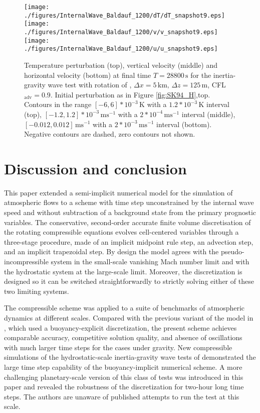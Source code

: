 \documentclass{ametsoc}
\theoremstyle{definition}
\begin{document}
\begin{figure}
\centering
 \texttt{[image: ./figures/InternalWave\_Baldauf\_1200/dT/dT\_snapshot9.eps]}
 \texttt{[image: ./figures/InternalWave\_Baldauf\_1200/v/v\_snapshot9.eps]}
 \texttt{[image: ./figures/InternalWave\_Baldauf\_1200/u/u\_snapshot9.eps]}
 \caption{Temperature perturbation (top), vertical velocity (middle) and horizontal velocity (bottom) at final time $T=28800\,\textrm{s}$ for the inertia-gravity wave test with rotation of \cite{BaldaufBrdar2013}, $\Delta x=5\,\textrm{km},\,\Delta z=125\,\textrm{m}$, CFL$_\textrm{adv}=0.9$. Initial perturbation as in Figure \ref{fig:SK94_H},top. Contours in the range $[-6, 6]*10^{-3}\,\textrm{K}$ with a $1.2*10^{-3}\,\textrm{K}$ interval (top), $[-1.2, 1.2]*10^{-3}\,\textrm{ms$^{-1}$}$  with a $2*10^{-4}\,\textrm{ms$^{-1}$}$ interval (middle), $[-0.012, 0.012]\,\textrm{ms$^{-1}$}$ with a $2*10^{-3}\,\textrm{ms$^{-1}$}$ interval (bottom). Negative contours are dashed, zero contours not shown.}
  \label{fig:BB13}
\end{figure}

\section{Discussion and conclusion}
\label{sec:Conclusions}	

This paper extended a semi-implicit numerical model for the simulation of atmospheric flows to a scheme with time step unconstrained by the internal wave speed and without subtraction of a background state from the primary prognostic variables. The conservative, second-order accurate finite volume discretisation of the rotating compressible equations evolves cell-centered variables through a three-stage procedure, made of an implicit midpoint rule step, an advection step, and an implicit trapezoidal step. By design the model agrees with the pseudo-incompressible system in the small-scale vanishing Mach number limit and with the hydrostatic system at the large-scale limit. Moreover, the discretization is designed so it can be switched straightforwardly to strictly solving either of these two limiting systems. 

The compressible scheme was applied to a suite of benchmarks of atmospheric dynamics at different scales. Compared with the previous variant of the model in \cite{Benacchio2014, BenacchioEtAl2014}, which used a buoyancy-explicit discretization, the present scheme achieves comparable accuracy, competitive solution quality, and absence of oscillations with much larger time steps for the cases under gravity. New compressible simulations of the hydrostatic-scale inertia-gravity wave tests of \citet{SkamarockKlemp1994} demonstrated the large time step capability of the buoyancy-implicit numerical scheme. A more challenging planetary-scale version of this class of tests was introduced in this paper and revealed the robustness of the discretization for two-hour long time steps. The authors are unaware of published attempts to run the test at this scale. 
\end{document}
